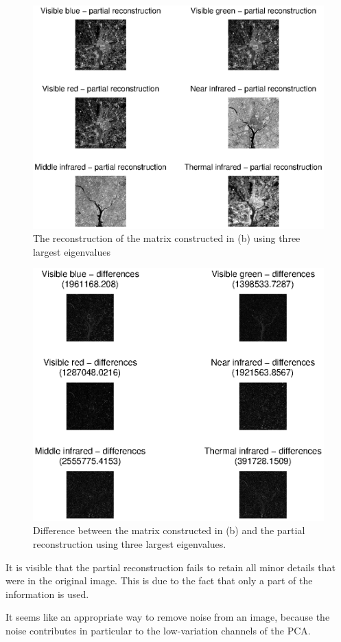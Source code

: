 \begin{figure}[htb]
 \centering
 \includegraphics[width=\linewidth]{partial_recon_pca.eps}
 \caption{The reconstruction of the matrix constructed in (b) using three largest eigenvalues}
 \label{fig:partial_recon_pca}
\end{figure}

\begin{figure}[htb]
 \centering
 \includegraphics[width=\linewidth]{differences_pca.eps}
 \caption{Difference between the matrix constructed in (b) and the partial reconstruction using three largest eigenvalues.}
 \label{fig:differences_pca}
\end{figure}

It is visible that the partial reconstruction fails to retain all minor details that were in the original image.
This is due to the fact that only a part of the information is used.

It seems like an appropriate way to remove noise from an image, because the noise contributes in particular to the low-variation channels of the PCA. 

\clearpage